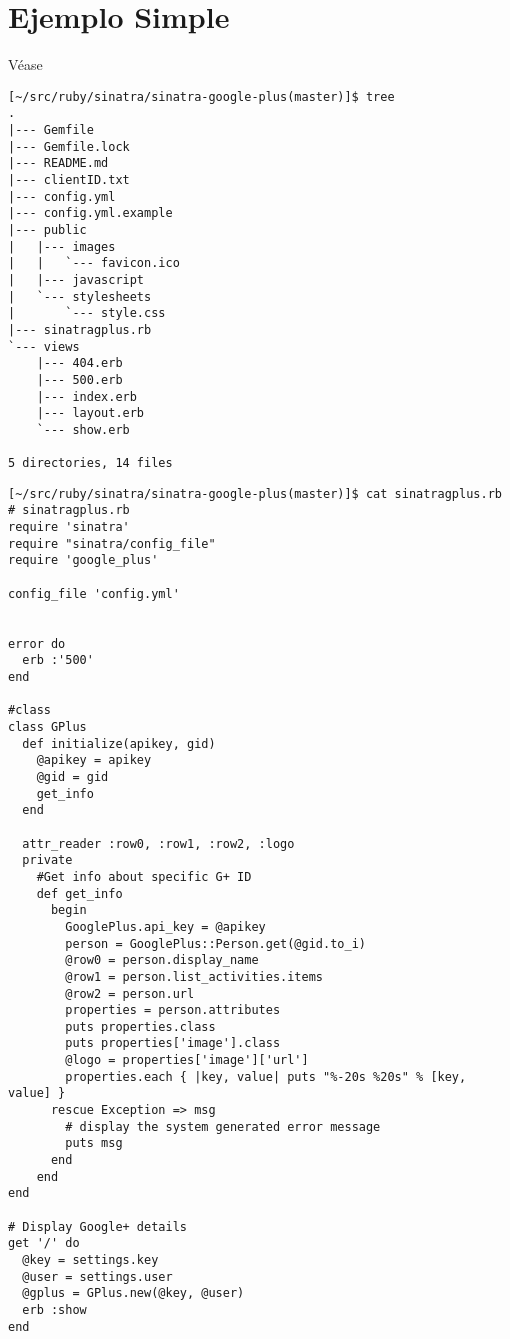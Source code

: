\section{Ejemplo Simple}

Véase
\begin{verbatim}
[~/src/ruby/sinatra/sinatra-google-plus(master)]$ tree
.
|--- Gemfile
|--- Gemfile.lock
|--- README.md
|--- clientID.txt
|--- config.yml
|--- config.yml.example
|--- public
|   |--- images
|   |   `--- favicon.ico
|   |--- javascript
|   `--- stylesheets
|       `--- style.css
|--- sinatragplus.rb
`--- views
    |--- 404.erb
    |--- 500.erb
    |--- index.erb
    |--- layout.erb
    `--- show.erb

5 directories, 14 files
\end{verbatim}

\begin{verbatim}
[~/src/ruby/sinatra/sinatra-google-plus(master)]$ cat sinatragplus.rb 
# sinatragplus.rb
require 'sinatra'
require "sinatra/config_file"
require 'google_plus'

config_file 'config.yml'


error do
  erb :'500'
end

#class
class GPlus
  def initialize(apikey, gid)
    @apikey = apikey
    @gid = gid
    get_info
  end

  attr_reader :row0, :row1, :row2, :logo
  private
    #Get info about specific G+ ID
    def get_info
      begin
        GooglePlus.api_key = @apikey
        person = GooglePlus::Person.get(@gid.to_i)
        @row0 = person.display_name
        @row1 = person.list_activities.items
        @row2 = person.url
        properties = person.attributes
        puts properties.class
        puts properties['image'].class
        @logo = properties['image']['url']
        properties.each { |key, value| puts "%-20s %20s" % [key, value] }
      rescue Exception => msg  
        # display the system generated error message  
        puts msg  
      end  
    end
end
 
# Display Google+ details
get '/' do
  @key = settings.key
  @user = settings.user
  @gplus = GPlus.new(@key, @user)
  erb :show
end
\end{verbatim}


